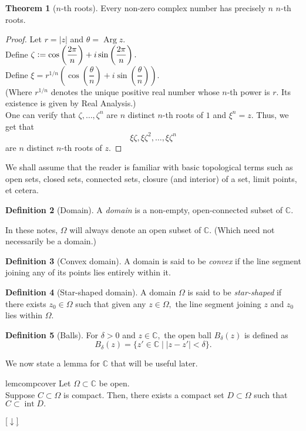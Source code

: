 \documentclass[12pt,oneside]{book}
\theoremstyle{definition}
\newtheorem{thm}{Theorem}
\numberwithin{thm}{chapter}
\newtheorem{defn}[thm]{Definition}
\newcommand{\Arg}{\operatorname{Arg}}
\newcommand{\downsym}{[$\downarrow$]}
\begin{document}
\begin{thm}[$n$-th roots]
	Every non-zero complex number has precisely $n$ $n$-th roots.
\end{thm}
\begin{proof} 
	Let $r = |z|$ and $\theta = \Arg z.$\\
	Define $\zeta \vcentcolon= \cos\left(\dfrac{2\pi}{n}\right) + i\sin\left(\dfrac{2\pi}{n}\right).$\\
	Define $\xi = r^{1/n}\left(\cos\left(\dfrac{\theta}{n}\right) + i\sin\left(\dfrac{\theta}{n}\right)\right).$\\
	(Where $r^{1/n}$ denotes the unique positive real number whose $n$-th power is $r$. Its existence is given by Real Analysis.)\\
	One can verify that $\zeta, \ldots, \zeta^{n}$ are $n$ distinct $n$-th roots of $1$ and $\xi^n = z.$ Thus, we get that
	\begin{equation*} 
		\xi\zeta, \xi\zeta^2, \ldots, \xi\zeta^n
	\end{equation*}
	are $n$ distinct $n$-th roots of $z.$
\end{proof}

We shall assume that the reader is familiar with basic topological terms such as open sets, closed sets, connected sets, closure (and interior) of a set, limit points, et cetera.

\begin{defn}[Domain]
	A \emph{domain} is a non-empty, open-connected subset of $\mathbb{C}.$
\end{defn}

In these notes, $\Omega$ will always denote an open subset of $\mathbb{C}.$ (Which need not necessarily be a domain.)

\begin{defn}[Convex domain]
	A domain is said to be \emph{convex} if the line segment joining any of its points lies entirely within it.
\end{defn}
\begin{defn}[Star-shaped domain]\label{def:starshaped}
	A domain $\Omega$ is said to be \emph{star-shaped} if there exists $z_0 \in \Omega$ such that given any $z \in \Omega,$ the line segment joining $z$ and $z_0$ lies within $\Omega.$
\end{defn}
\begin{defn}[Balls]
	For $\delta > 0$ and $z \in \mathbb{C},$ the open ball $B_\delta(z)$ is defined as
	\begin{equation*} 
		B_\delta(z) = \{z' \in \mathbb{C} \mid |z - z'| < \delta\}.
	\end{equation*}
\end{defn}
We now state a lemma for $\mathbb{C}$ that will be useful later.
\begin{restatable}[]{lem}{compcover}
\label{lem:compcover}
	Let $\Omega \subset \mathbb{C}$ be open.\\
	Suppose $C \subset \Omega$ is compact. Then, there exists a compact set $D \subset \Omega$ such that $C \subset \operatorname{int} D.$
\end{restatable}
\begin{flushright}\hyperref[lem:compcover2]{\downsym}\end{flushright}
\end{document}
